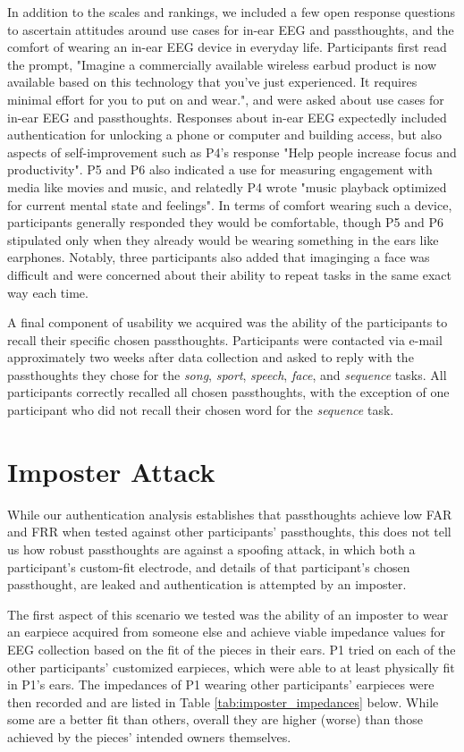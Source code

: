 \documentclass{sigchi}
\begin{document}
In addition to the scales and rankings, we included a few open response questions to ascertain attitudes around use cases for in-ear EEG and passthoughts, and the comfort of wearing an in-ear EEG device in everyday life. Participants first read the prompt, "Imagine a commercially available wireless earbud product is now available based on this technology that you've just experienced. It requires minimal effort for you to put on and wear.", and were asked about use cases for in-ear EEG and passthoughts. Responses about in-ear EEG expectedly included authentication for unlocking a phone or computer and building access, but also aspects of self-improvement such as P4's response "Help people increase focus and productivity". P5 and P6 also indicated a use for measuring engagement with media like movies and music, and relatedly P4 wrote "music playback optimized for current mental state and feelings". In terms of comfort wearing such a device, participants generally responded they would be comfortable, though P5 and P6 stipulated only when they already would be wearing something in the ears like earphones. Notably, three participants also added that imaginging a face was difficult and were concerned about their ability to repeat tasks in the same exact way each time.

A final component of usability we acquired was the ability of the participants to recall their specific chosen passthoughts. Participants were contacted via e-mail approximately two weeks after data collection and asked to reply with the passthoughts they chose for the \textit{song}, \textit{sport}, \textit{speech}, \textit{face}, and \textit{sequence} tasks. All participants correctly recalled all chosen passthoughts, with the exception of one participant who did not recall their chosen word for the \textit{sequence} task. 

\section{Imposter Attack}

While our authentication analysis establishes that passthoughts achieve low FAR and FRR when tested against other participants' passthoughts, this does not tell us how robust passthoughts are against a spoofing attack, in which both a participant's custom-fit electrode, and details of that participant's chosen passthought, are leaked and authentication is attempted by an imposter. 

The first aspect of this scenario we tested was the ability of an imposter to wear an earpiece acquired from someone else and achieve viable impedance values for EEG collection based on the fit of the pieces in their ears. P1 tried on each of the other participants' customized earpieces, which were able to at least physically fit in P1's ears. The impedances of P1 wearing other participants' earpieces were then recorded and are listed in Table \ref{tab:imposter_impedances} below. While some are a better fit than others, overall they are higher (worse) than those achieved by the pieces' intended owners themselves.
\end{document}
